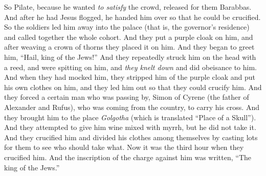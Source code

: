 \begin{biblechapter}
\verse So Pilate, because he wanted \textit{to satisfy} the crowd, released for them Barabbas. And after he had Jesus flogged, he handed him over so that he could be crucified.
 So the soldiers led him away into the palace (that is, the governor’s residence) and called together the whole cohort.
\verse And they put a purple cloak on him, and after weaving a crown of thorns they placed it on him.
\verse And they began to greet him, “Hail, king of the Jews!”
\verse And they repeatedly struck him on the head with a reed, and were spitting on him, and \textit{they knelt down} and did obeisance to him.
\verse And when they had mocked him, they stripped him of the purple cloak and put his own clothes on him, and they led him out so that they could crucify him.
 And they forced a certain man who was passing by, Simon of Cyrene (the father of Alexander and Rufus), who was coming from the country, to carry his cross.
\verse And they brought him to the place \textit{Golgotha} (which is translated “Place of a Skull”).
\verse And they attempted to give him wine mixed with myrrh, but he did not take it.
\verse And they crucified him and divided his clothes among themselves by casting lots for them to see who should take what.
\verse Now it was the third hour when they crucified him.
\verse And the inscription of the charge against him was written, “The king of the Jews.”

\end{biblechapter}
